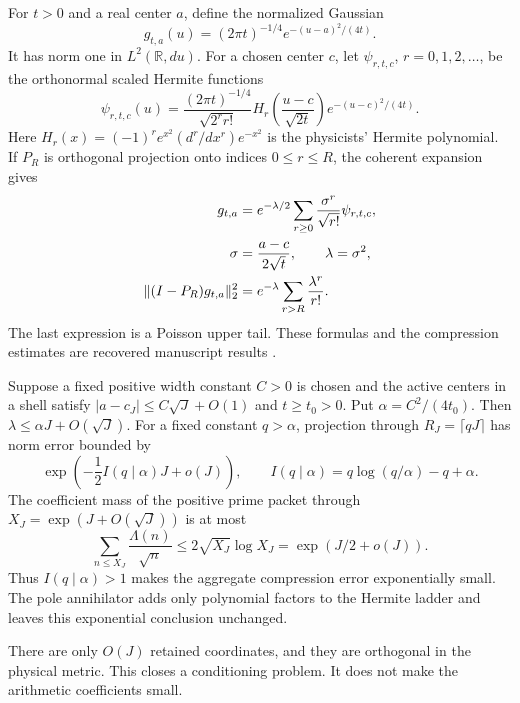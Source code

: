 For \(t>0\) and a real center \(a\), define the normalized Gaussian
\begin{equation}\label{rh:gaussian}
g_{t,a}(u)=(2\pi t)^{-1/4}e^{-(u-a)^2/(4t)}.
\end{equation}
It has norm one in \(L^2(\mathbb R,du)\). For a chosen center \(c\), let \(\psi_{r,t,c}\), \(r=0,1,2,\ldots\), be the orthonormal scaled Hermite functions
\begin{equation}\label{rh:hermite}
\psi_{r,t,c}(u)=
\frac{(2\pi t)^{-1/4}}{\sqrt{2^r r!}}
H_r\left(\frac{u-c}{\sqrt{2t}}\right)e^{-(u-c)^2/(4t)}.
\end{equation}
Here \(H_r(x)=(-1)^r e^{x^2}(d^r/dx^r)e^{-x^2}\) is the physicists' Hermite polynomial. If \(P_R\) is orthogonal projection onto indices \(0\le r\le R\), the coherent expansion gives
\begin{align}
g_{t,a}&=e^{-\lambda/2}
\sum_{r\ge0}\frac{\sigma^r}{\sqrt{r!}}\psi_{r,t,c},
\label{rh:coherent}\\
\sigma&=\frac{a-c}{2\sqrt t},\qquad \lambda=\sigma^2,
\notag\\
\|(I-P_R)g_{t,a}\|_2^2
&=e^{-\lambda}\sum_{r>R}\frac{\lambda^r}{r!}.
\label{rh:poisson}
\end{align}
The last expression is a Poisson upper tail. These formulas and the compression estimates are recovered manuscript results \cite{KomorebiHermite}.

Suppose a fixed positive width constant \(C>0\) is chosen and the active centers in a shell satisfy
\(|a-c_J|\le C\sqrt J+O(1)\) and \(t\ge t_0>0\). Put
\(\alpha=C^2/(4t_0)\). Then \(\lambda\le\alpha J+O(\sqrt J)\). For a fixed constant \(q>\alpha\), projection through \(R_J=\lceil qJ\rceil\) has norm error bounded by
\begin{equation}\label{rh:rate}
\exp\left(-\frac12 I(q\mid\alpha)J+o(J)\right),
\qquad I(q\mid\alpha)=q\log(q/\alpha)-q+\alpha.
\end{equation}
The coefficient mass of the positive prime packet through
\(X_J=\exp(J+O(\sqrt J))\) is at most
\[
\sum_{n\le X_J}\frac{\Lambda(n)}{\sqrt n}
\le2\sqrt{X_J}\log X_J=\exp(J/2+o(J)).
\]
Thus \(I(q\mid\alpha)>1\) makes the aggregate compression error exponentially small. The pole annihilator adds only polynomial factors to the Hermite ladder and leaves this exponential conclusion unchanged.

There are only \(O(J)\) retained coordinates, and they are orthogonal in the physical metric. This closes a conditioning problem. It does not make the arithmetic coefficients small.

